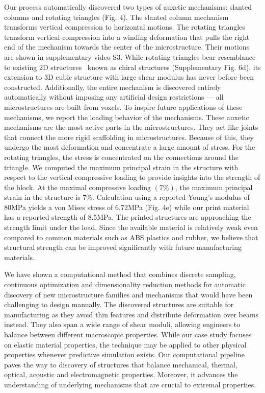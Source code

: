 Our process automatically discovered two types of auxetic mechanisms: slanted columns and rotating triangles (Fig. 4). The slanted column mechanism transforms vertical compression to horizontal motions. The rotating triangles transform vertical compression into a winding deformation that pulls the right end of the mechanism towards the center of the microstructure.
Their motions are shown in supplementary video S3.
While rotating triangles bear resemblance to existing 2D structures~\citep{alderson2010elastic} known as chiral structures (Supplementary Fig. 6d), its extension to 3D cubic structure with large shear modulus has never before been constructed. Additionally, the entire mechanism is discovered entirely automatically without imposing any artificial design restrictions --- all microstructures are built from voxels. To inspire future applications of these mechanisms, we report the loading behavior of the mechanisms. These auxetic mechanisms are the most active parts in the microstructures. They act like joints that connect the more rigid scaffolding in microstructures. Because of this, they undergo the most deformation and concentrate a large amount of stress. For the rotating triangles, the stress is concentrated on the connections around the triangle. We computed the maximum principal strain in the structure with respect to the vertical compressive loading to provide insights into the strength of the block.
At the maximal compressive loading $(7\%)$, the maximum principal strain in the structure is $7\%$. Calculation using a reported Young's modulus of 80MPa yields a von Mises stress of 6.72MPa (Fig. 4e) while our print material has a reported strength of 8.5MPa. The printed structures are approaching the strength limit under the load. Since the available material is relatively weak even compared to common materials such as ABS plastics and rubber, we believe that structural strength can be improved significantly with future manufacturing materials.

We have shown a computational method that combines discrete sampling, continuous optimization and dimensionality reduction methods for automatic discovery of new microstructure families and mechanisms that would have been challenging to design manually.
The discovered structures are suitable for manufacturing as they avoid thin features and distribute deformation over beams instead. They also span a wide range of shear moduli, allowing engineers to balance between different macroscopic properties. While our case study focuses on elastic material properties, the technique may be applied to other physical properties whenever predictive simulation exists. Our computational pipeline paves the way to discovery of structures that balance mechanical, thermal, optical, acoustic and electromagnetic properties. Moreover, it advances the understanding of underlying mechanisms that are crucial to extremal properties.
